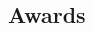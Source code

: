 \documentclass[10pt]{article} %
\begin{document}
\begin{paracol}{2}


  \section{Awards}





  \begin{supertabular}{rl} %


\end{supertabular}
\end{paracol}
\end{document}
